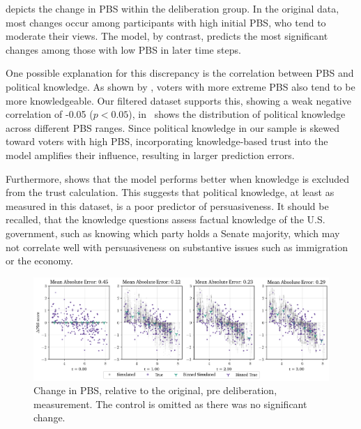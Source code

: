  depicts the change in PBS within the deliberation
group. In the original data, most changes occur among participants
with high initial PBS, who tend to moderate their views. The model, by
contrast, predicts the most significant changes among those with low PBS in
later time steps.

One possible explanation for this discrepancy is the correlation between PBS
and political knowledge. As shown by
\citet{fishkinCanDeliberationHave2024}, voters with more extreme PBS also tend
to be more knowledgeable. Our filtered dataset supports this, showing a weak
negative correlation of -0.05 ($p < 0.05$), 
in~ shows the distribution of political knowledge across
different PBS ranges. Since political knowledge in our sample is skewed toward
voters with high PBS, incorporating knowledge-based trust into the model
amplifies their influence, resulting in larger prediction errors.

Furthermore,  shows that the model performs better when
knowledge is excluded from the trust calculation. This suggests that political
knowledge, at least as measured in this dataset, is a poor predictor of
persuasiveness. It should be recalled, that the knowledge questions assess factual
knowledge of the U.S. government, such as knowing which party holds a
Senate majority, which may not correlate well with persuasiveness on substantive
issues such as immigration or the economy.


\begin{figure}[ht]
	\begin{center}
		\includegraphics[width=\textwidth]{Figures/change_pbs_scores.png}
	\end{center}
	\caption{Change in  PBS, relative to the original, pre deliberation, measurement. The control is  omitted as there was no significant change.}\label{fig:delta_pbs}
\end{figure}


